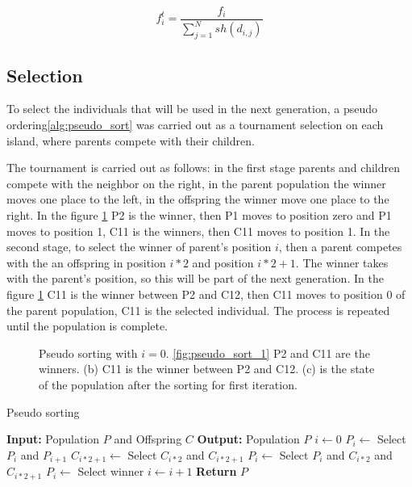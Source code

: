 \begin{equation}
  \label{shared_eq_ind}
  f^t_i = \frac{f_i}{\sum_{j=1}^N sh(d_{i,j})}
\end{equation}

\subsection{Selection}

To select the individuals that will be used in the next generation, a pseudo ordering\ref{alg:pseudo_sort} was carried out as a tournament selection on each island, where parents compete with their children.

The tournament is carried out as follows: in the first stage parents and children compete with the neighbor on the right, in the parent population the winner moves one place to the left, in the offspring the winner move one place to the right. In the figure \ref{fig:pseudo_sort} P2 is the winner, then P1 moves to position zero and P1 moves to position 1, C11 is the winners, then C11 moves to position 1. In the second stage, to select the winner of parent's position $i$, then a parent competes  with the an offspring in position $i * 2$ and position $i * 2 + 1$. The winner takes with the parent's position, so this will be part of the next generation. In the figure \ref{fig:pseudo_sort} C11 is the winner between P2 and C12, then C11 moves to position 0 of the parent population, C11 is the selected individual. The process is repeated until the population is complete.



\begin{figure}[ht]
  \centering
  \subfloat[Stage 1]{
    
    \label{fig:pseudo_sort_1}
  }
  \subfloat[Stage 2]{
    
    \label{fig:pseudo_sort_2}
  }
  \subfloat[Stage 3]{
    
    \label{fig:pseudo_sort_3}
  }
  \caption{Pseudo sorting with $i=0$. \ref{fig:pseudo_sort_1} P2 and C11 are the winners. (b) C11 is the winner between P2 and C12. (c) is the state of the population after the sorting for first iteration.}
  \label{fig:pseudo_sort}
\end{figure}



\begin{algorithm}[H]
  \caption{Pseudo sorting}
  \label{alg:pseudo_sort}
  \begin{algorithmic}[1]
    \State \textbf{Input:} Population $P$ and Offspring $C$
    \State \textbf{Output:} Population $P$
    \State $i \gets 0$
    \State $P_i \gets$ Select $P_i$ and $P_{i+1}$
    \State $C_{i*2+1} \gets$ Select $C_{i*2}$ and $C_{i*2+1}$
    \State $P_i \gets$ Select $P_i$ and $C_{i*2}$ and $C_{i*2+1}$
    \State $P_i \gets$ Select winner
    \State $i \gets i + 1$
    \EndWhile
    \State \textbf{Return} $P$
  \end{algorithmic}
\end{algorithm}


